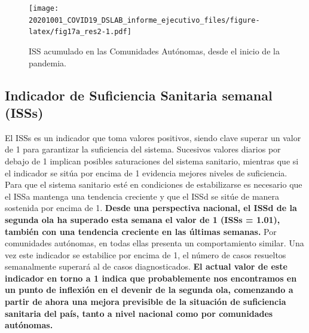 \documentclass[
  11pt,
]{article}
\begin{document}
\vspace{0.2cm}

\begin{figure}
\centering
\texttt{[image: 20201001\_COVID19\_DSLAB\_informe\_ejecutivo\_files/figure-latex/fig17a\_res2-1.pdf]}
\caption{\label{fig:fig17a_res} ISS acumulado en las Comunidades
Autónomas, desde el inicio de la pandemia.}
\end{figure}

\clearpage

\hypertarget{indicador-de-suficiencia-sanitaria-semanal-isss}{%
\subsection{Indicador de Suficiencia Sanitaria semanal
(ISSs)}\label{indicador-de-suficiencia-sanitaria-semanal-isss}}

El ISSs es un indicador que toma valores positivos, siendo clave superar
un valor de 1 para garantizar la suficiencia del sistema. Sucesivos
valores diarios por debajo de 1 implican posibles saturaciones del
sistema sanitario, mientras que si el indicador se sitúa por encima de 1
evidencia mejores niveles de suficiencia. Para que el sistema sanitario
esté en condiciones de estabilizarse es necesario que el ISSa mantenga
una tendencia creciente y que el ISSd se sitúe de manera sostenida por
encima de 1. \textbf{Desde una perspectiva nacional, el ISSd de la
segunda ola ha superado esta semana el valor de 1 (ISSs = 1.01), también
con una tendencia creciente en las últimas semanas.} Por comunidades
autónomas, en todas ellas presenta un comportamiento similar. Una vez
este indicador se estabilice por encima de 1, el número de casos
resueltos semanalmente superará al de casos diagnosticados. \textbf{El
actual valor de este indicador en torno a 1 indica que probablemente nos
encontramos en un punto de inflexión en el devenir de la segunda ola,
comenzando a partir de ahora una mejora previsible de la situación de
suficiencia sanitaria del país, tanto a nivel nacional como por
comunidades autónomas.}
\end{document}
